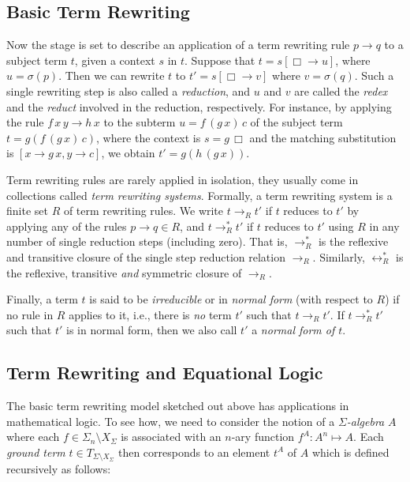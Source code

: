 \documentclass[a4paper,12pt]{article}
\begin{document}
\subsection{Basic Term Rewriting}

Now the stage is set to describe an application of a term rewriting rule $p\rightarrow q$ to a subject term $t$, given a context $s$ in $t$. Suppose that $t=s[\Box\rightarrow u]$, where $u=\sigma(p)$. Then we can rewrite $t$ to $t'=s[\Box\rightarrow v]$ where $v=\sigma(q)$. Such a single rewriting step is also called a \emph{reduction}, and $u$ and $v$ are called the \emph{redex} and the \emph{reduct} involved in the reduction, respectively. For instance, by applying the rule $f\,x\,y\rightarrow h\,x$ to the subterm $u=f\,(g\,x)\,c$ of the subject term $t=g (f\,(g\,x)\,c)$, where the context is $s=g\,\Box$ and the matching substitution is $[x\rightarrow g\,x,y\rightarrow c]$, we obtain $t'=g (h\,(g\,x))$.

Term rewriting rules are rarely applied in isolation, they usually come in collections called \emph{term rewriting systems}. Formally, a term rewriting system is a finite set $R$ of term rewriting rules. We write $t\mathrel{\rightarrow_R} t'$ if $t$ reduces to $t'$ by applying any of the rules $p\rightarrow q\in R$, and $t\mathrel{\rightarrow_R^*} t'$ if $t$ reduces to $t'$ using $R$ in any number of single reduction steps (including zero). That is, $\rightarrow_R^*$ is the reflexive and transitive closure of the single step reduction relation $\rightarrow_R$. Similarly, $\leftrightarrow_R^*$ is the reflexive, transitive \emph{and} symmetric closure of $\rightarrow_R$.

Finally, a term $t$ is said to be \emph{irreducible} or in \emph{normal form} (with respect to $R$) if no rule in $R$ applies to it, i.e., there is \emph{no} term $t'$ such that $t\mathrel{\rightarrow_R} t'$. If $t\mathrel{\rightarrow_R^*} t'$ such that $t'$ is in normal form, then we also call $t'$ a \emph{normal form of $t$}.

\subsection{Term Rewriting and Equational Logic}

The basic term rewriting model sketched out above has applications in mathematical logic. To see how, we need to consider the notion of a \emph{$\Sigma$-algebra} $A$ where each $f\in\Sigma_n\setminus X_\Sigma$ is associated with an $n$-ary function $f^A:A^n\mapsto A$. Each \emph{ground term} $t\in T_{\Sigma\setminus X_\Sigma}$ then corresponds to an element $t^A$ of $A$ which is defined recursively as follows:
\end{document}
